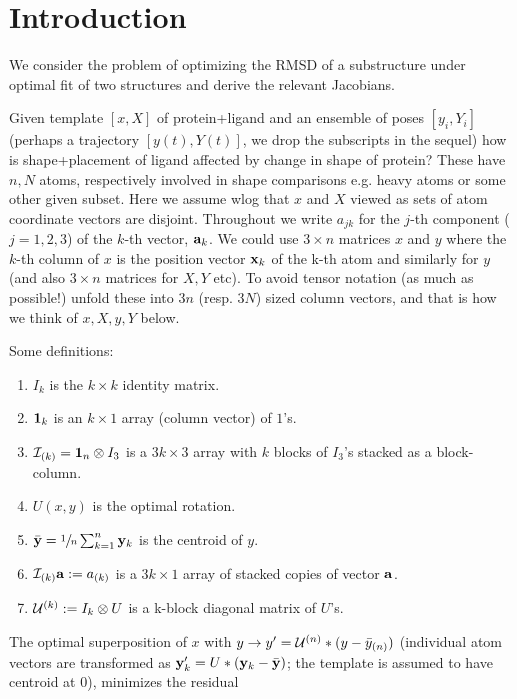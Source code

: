 \documentclass[9pt,lineno]{elife}
\begin{document}
\section{Introduction}

We consider the problem of optimizing the RMSD of a substructure under optimal fit of two
structures and derive the relevant Jacobians.

Given template $\left[x,X\right]$ of protein+ligand and an ensemble of poses
$\left[y_i,Y_i\right]$ (perhaps a trajectory $\left[y(t),Y(t)\right]$, we drop the subscripts
in the sequel) how is shape+placement
of ligand affected by change in shape of protein? These have $n,N$ atoms, respectively 
involved in shape comparisons e.g. heavy atoms or some other given subset. 
Here we assume wlog that $x$ and $X$ viewed as sets of atom coordinate vectors are disjoint.
Throughout we write
$a_{jk}$ for the $j$-th component ($j=1,2,3$) of the $k$-th vector, ${\bf a}_k$.
We could use $3\times n$ matrices $x$ 
and $y$ where the $k$-th column of $x$ is the position vector 
${\bf x}_k$ of the k-th atom and similarly for $y$ (and also $3\times n$ matrices 
for $X, Y$ etc). 
To avoid tensor notation (as much as possible!) unfold these into $3n$ (resp. $3N$)
sized column vectors, and that is how we think of $x,X,y,Y$ below.

Some definitions:
\begin{enumerate}
\item $I_k$ is the $k\times k$ identity matrix.
\item ${\bf 1}_k$ is an $k\times 1$ array (column vector) of $1$'s.
\item ${\cal I}_{(k)} = {\bf 1}_n\otimes I_3$ is a $3k\times 3$ array with
$k$ blocks of $I_3$'s stacked as a block-column. 
\item $U(x,y)$ is the optimal rotation.
\item $\bar{\bf y} = \sfrac{1}{n} \sum_{k=1}^n {\bf y}_k $ is the centroid of $y$.
\item ${\cal I}_{(k)} {\bf a} := a_{(k)}$ is a $3k\times 1$ array of stacked
copies of vector $\bf a$.
\item ${\cal U}^{(k)} := I_k\otimes U$ is a k-block diagonal matrix of $U$'s.
\end{enumerate}

 The optimal superposition of $x$ with 
$y \rightarrow y' = {\cal U}^{(n)}*(y-\bar{y}_{(n)})$
(individual atom vectors are transformed as
${\bf y}_k^{\prime} = U*({\bf y}_k-\bar{\bf y})$;
the template is assumed to have centroid at 0),
minimizes the residual
\end{document}
